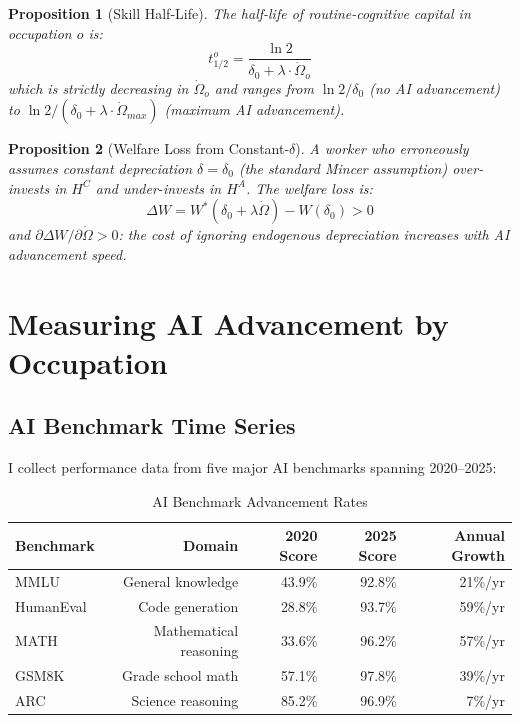\documentclass[11pt,a4paper]{article}
\newtheorem{proposition}{Proposition}
\theoremstyle{definition}
\begin{document}
\begin{proposition}[Skill Half-Life]
\label{prop:halflife}
The half-life of routine-cognitive capital in occupation $o$ is:
\begin{equation}
t_{1/2}^o = \frac{\ln 2}{\delta_0 + \lambda \cdot \dot{\Omega}_o}
\label{eq:halflife}
\end{equation}
which is strictly decreasing in $\dot{\Omega}_o$ and ranges from $\ln 2 / \delta_0$ (no AI advancement) to $\ln 2 / (\delta_0 + \lambda \cdot \dot{\Omega}_{max})$ (maximum AI advancement).
\end{proposition}

\begin{proposition}[Welfare Loss from Constant-$\delta$]
\label{prop:welfare}
A worker who erroneously assumes constant depreciation $\delta = \delta_0$ (the standard Mincer assumption) over-invests in $H^C$ and under-invests in $H^A$. The welfare loss is:
\begin{equation}
\Delta W = W^*(\delta_0 + \lambda\dot{\Omega}) - W(\delta_0) > 0
\end{equation}
and $\partial \Delta W / \partial \dot{\Omega} > 0$: the cost of ignoring endogenous depreciation increases with AI advancement speed.
\end{proposition}


\section{Measuring AI Advancement by Occupation}
\label{sec:omega}

\subsection{AI Benchmark Time Series}

I collect performance data from five major AI benchmarks spanning 2020--2025:

\begin{table}[htbp]
\centering
\caption{AI Benchmark Advancement Rates}
\label{tab:benchmarks}
\begin{tabular}{lrrrr}
\toprule
Benchmark & Domain & 2020 Score & 2025 Score & Annual Growth \\
\midrule
MMLU & General knowledge & 43.9\% & 92.8\% & 21\%/yr \\
HumanEval & Code generation & 28.8\% & 93.7\% & 59\%/yr \\
MATH & Mathematical reasoning & 33.6\% & 96.2\% & 57\%/yr \\
GSM8K & Grade school math & 57.1\% & 97.8\% & 39\%/yr \\
ARC & Science reasoning & 85.2\% & 96.9\% & 7\%/yr \\
\bottomrule
\end{tabular}
\end{table}
\end{document}
